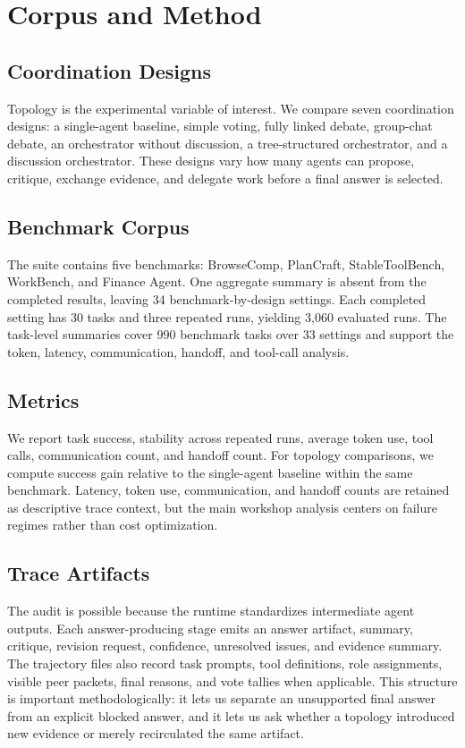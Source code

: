 \documentclass{article}
\theoremstyle{plain}
\theoremstyle{definition}
\theoremstyle{remark}
\begin{document}
\section{Corpus and Method}
\subsection{Coordination Designs}
Topology is the experimental variable of interest. We compare seven coordination designs: a single-agent baseline, simple voting, fully linked debate, group-chat debate, an orchestrator without discussion, a tree-structured orchestrator, and a discussion orchestrator. These designs vary how many agents can propose, critique, exchange evidence, and delegate work before a final answer is selected.

\subsection{Benchmark Corpus}
The suite contains five benchmarks: BrowseComp, PlanCraft, StableToolBench, WorkBench, and Finance Agent. One aggregate summary is absent from the completed results, leaving 34 benchmark-by-design settings. Each completed setting has 30 tasks and three repeated runs, yielding 3,060 evaluated runs. The task-level summaries cover 990 benchmark tasks over 33 settings and support the token, latency, communication, handoff, and tool-call analysis.

\subsection{Metrics}
We report task success, stability across repeated runs, average token use, tool calls, communication count, and handoff count. For topology comparisons, we compute success gain relative to the single-agent baseline within the same benchmark. Latency, token use, communication, and handoff counts are retained as descriptive trace context, but the main workshop analysis centers on failure regimes rather than cost optimization.

\subsection{Trace Artifacts}
The audit is possible because the runtime standardizes intermediate agent outputs. Each answer-producing stage emits an answer artifact, summary, critique, revision request, confidence, unresolved issues, and evidence summary. The trajectory files also record task prompts, tool definitions, role assignments, visible peer packets, final reasons, and vote tallies when applicable. This structure is important methodologically: it lets us separate an unsupported final answer from an explicit blocked answer, and it lets us ask whether a topology introduced new evidence or merely recirculated the same artifact.
\end{document}
